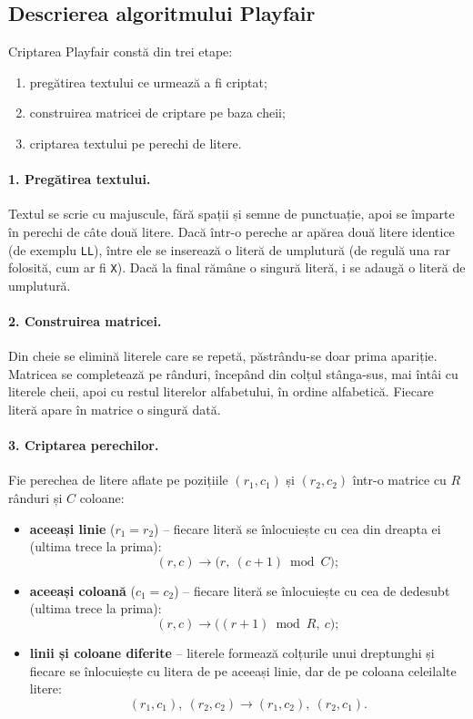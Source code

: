 \documentclass[12pt,a4paper]{article}
\begin{document}
\subsection{Descrierea algoritmului Playfair}

Criptarea Playfair constă din trei etape:
\begin{enumerate}
    \item pregătirea textului ce urmează a fi criptat;
    \item construirea matricei de criptare pe baza cheii;
    \item criptarea textului pe perechi de litere.
\end{enumerate}

\paragraph{1. Pregătirea textului.} Textul se scrie cu majuscule, fără spații și
semne de punctuație, apoi se împarte în perechi de câte două litere. Dacă într-o
pereche ar apărea două litere identice (de exemplu \texttt{LL}), între ele se
inserează o literă de umplutură (de regulă una rar folosită, cum ar fi \texttt{X}).
Dacă la final rămâne o singură literă, i se adaugă o literă de umplutură.

\paragraph{2. Construirea matricei.} Din cheie se elimină literele care se repetă,
păstrându-se doar prima apariție. Matricea se completează pe rânduri, începând din
colțul stânga-sus, mai întâi cu literele cheii, apoi cu restul literelor
alfabetului, în ordine alfabetică. Fiecare literă apare în matrice o singură dată.

\paragraph{3. Criptarea perechilor.} Fie perechea de litere aflate pe pozițiile
$(r_1, c_1)$ și $(r_2, c_2)$ într-o matrice cu $R$ rânduri și $C$ coloane:
\begin{itemize}
    \item \textbf{aceeași linie} ($r_1 = r_2$) -- fiecare literă se înlocuiește cu
    cea din dreapta ei (ultima trece la prima):
    \[
        (r, c) \rightarrow \bigl(r,\ (c + 1) \bmod C\bigr);
    \]
    \item \textbf{aceeași coloană} ($c_1 = c_2$) -- fiecare literă se înlocuiește
    cu cea de dedesubt (ultima trece la prima):
    \[
        (r, c) \rightarrow \bigl((r + 1) \bmod R,\ c\bigr);
    \]
    \item \textbf{linii și coloane diferite} -- literele formează colțurile unui
    dreptunghi și fiecare se înlocuiește cu litera de pe aceeași linie, dar de pe
    coloana celeilalte litere:
    \[
        (r_1, c_1),\ (r_2, c_2) \rightarrow (r_1, c_2),\ (r_2, c_1).
    \]
\end{itemize}
\end{document}
